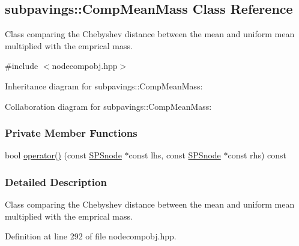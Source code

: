 \hypertarget{classsubpavings_1_1CompMeanMass}{\subsection{subpavings\-:\-:\-Comp\-Mean\-Mass \-Class \-Reference}
\label{classsubpavings_1_1CompMeanMass}
}


\-Class comparing the \-Chebyshev distance between the mean and uniform mean multiplied with the emprical mass.  




{\ttfamily \#include $<$nodecompobj.\-hpp$>$}



\-Inheritance diagram for subpavings\-:\-:\-Comp\-Mean\-Mass\-:


\-Collaboration diagram for subpavings\-:\-:\-Comp\-Mean\-Mass\-:
\subsubsection*{\-Private \-Member \-Functions}
\begin{DoxyCompactItemize}
\item 
bool \hyperlink{classsubpavings_1_1CompMeanMass_a160308bb8acb75a4c8efe4bae9efc962}{operator()} (const \hyperlink{classsubpavings_1_1SPSnode}{\-S\-P\-Snode} $\ast$const lhs, const \hyperlink{classsubpavings_1_1SPSnode}{\-S\-P\-Snode} $\ast$const rhs) const 
\end{DoxyCompactItemize}


\subsubsection{\-Detailed \-Description}
\-Class comparing the \-Chebyshev distance between the mean and uniform mean multiplied with the emprical mass. 

\-Definition at line 292 of file nodecompobj.\-hpp.



